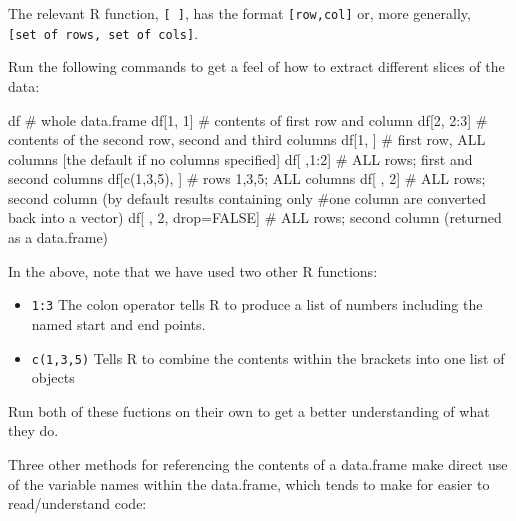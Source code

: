 \documentclass[
  letterpaper,
  krantz2]{style/krantz}
\newenvironment{Shaded}{\begin{snugshade}}{\end{snugshade}}
\newcommand{\CommentTok}[1]{\textcolor[rgb]{0.37,0.37,0.37}{#1}}
\newcommand{\ConstantTok}[1]{\textcolor[rgb]{0.56,0.35,0.01}{#1}}
\newcommand{\DecValTok}[1]{\textcolor[rgb]{0.68,0.00,0.00}{#1}}
\newcommand{\FunctionTok}[1]{\textcolor[rgb]{0.28,0.35,0.67}{#1}}
\newcommand{\NormalTok}[1]{\textcolor[rgb]{0.00,0.23,0.31}{#1}}
\newcommand{\OtherTok}[1]{\textcolor[rgb]{0.00,0.23,0.31}{#1}}
\newcommand{\SpecialCharTok}[1]{\textcolor[rgb]{0.37,0.37,0.37}{#1}}
\begin{document}
The relevant R function, \texttt{{[}\ {]}}, has the format
\texttt{{[}row,col{]}} or, more generally,
\texttt{{[}set\ of\ rows,\ set\ of\ cols{]}}.

Run the following commands to get a feel of how to extract different
slices of the data:

\begin{Shaded}
\begin{Highlighting}[]
\NormalTok{df }\CommentTok{\# whole data.frame}
\NormalTok{df[}\DecValTok{1}\NormalTok{, }\DecValTok{1}\NormalTok{] }\CommentTok{\# contents of first row and column}
\NormalTok{df[}\DecValTok{2}\NormalTok{, }\DecValTok{2}\SpecialCharTok{:}\DecValTok{3}\NormalTok{] }\CommentTok{\# contents of the second row, second and third columns}
\NormalTok{df[}\DecValTok{1}\NormalTok{, ] }\CommentTok{\# first row, ALL columns [the default if no columns specified]}
\NormalTok{df[ ,}\DecValTok{1}\SpecialCharTok{:}\DecValTok{2}\NormalTok{] }\CommentTok{\# ALL rows; first and second columns}
\NormalTok{df[}\FunctionTok{c}\NormalTok{(}\DecValTok{1}\NormalTok{,}\DecValTok{3}\NormalTok{,}\DecValTok{5}\NormalTok{), ] }\CommentTok{\# rows 1,3,5; ALL columns}
\NormalTok{df[ , }\DecValTok{2}\NormalTok{] }\CommentTok{\# ALL rows; second column (by default results containing only }
             \CommentTok{\#one column are converted back into a vector)}
\NormalTok{df[ , }\DecValTok{2}\NormalTok{, drop}\OtherTok{=}\ConstantTok{FALSE}\NormalTok{] }\CommentTok{\# ALL rows; second column (returned as a data.frame)}
\end{Highlighting}
\end{Shaded}

In the above, note that we have used two other R functions:

\begin{itemize}
\item
  \texttt{1:3} The colon operator tells R to produce a list of numbers
  including the named start and end points.
\item
  \texttt{c(1,3,5)} Tells R to combine the contents within the brackets
  into one list of objects
\end{itemize}

Run both of these fuctions on their own to get a better understanding of
what they do.

Three other methods for referencing the contents of a data.frame make
direct use of the variable names within the data.frame, which tends to
make for easier to read/understand code:
\end{document}
